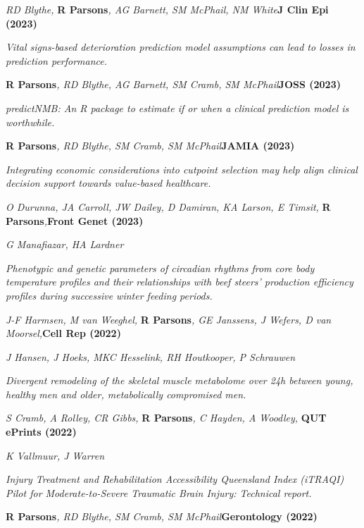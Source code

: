 \item
    \textit{RD Blythe, }\textbf{R Parsons}\textit{, AG Barnett, SM McPhail, NM White}\textbf{\hfill{J Clin Epi (2023)}}\par
    \textit{Vital signs-based deterioration prediction model assumptions can lead to losses in prediction performance.}
\item
    \textbf{R Parsons}\textit{, RD Blythe, AG Barnett, SM Cramb, SM McPhail}\textbf{\hfill{JOSS (2023)}}\par
    \textit{predictNMB: An R package to estimate if or when a clinical prediction model is worthwhile.}
\item
    \textbf{R Parsons}\textit{, RD Blythe, SM Cramb, SM McPhail}\textbf{\hfill{JAMIA (2023)}}\par
    \textit{Integrating economic considerations into cutpoint selection may help align clinical decision support towards value-based healthcare.}
\item
    \textit{O Durunna, JA Carroll, JW Dailey, D Damiran, KA Larson, E Timsit, }\textbf{R Parsons}\textit{,}\textbf{\hfill{Front Genet (2023)}}\par
	\textit{G Manafiazar, HA Lardner}\par
    \textit{Phenotypic and genetic parameters of circadian rhythms from core body temperature profiles and their relationships with beef steers’ production efficiency profiles during successive winter feeding periods.}
\item
    \textit{J-F Harmsen, M van Weeghel, }\textbf{R Parsons}\textit{, GE Janssens, J Wefers, D van Moorsel,}\textbf{\hfill{Cell Rep (2022)}}\par
	\textit{J Hansen, J Hoeks, MKC Hesselink, RH Houtkooper, P Schrauwen}\par
    \textit{Divergent remodeling of the skeletal muscle metabolome over 24h between young, healthy men and older, metabolically compromised men.}
\item
    \textit{S Cramb, A Rolley, CR Gibbs, }\textbf{R Parsons}\textit{, C Hayden, A Woodley, }\textbf{\hfill{QUT ePrints (2022)}}\par
	\textit{K Vallmuur, J Warren}\par
	\textit{Injury Treatment and Rehabilitation Accessibility Queensland Index (iTRAQI) Pilot for Moderate-to-Severe Traumatic Brain Injury: Technical report.}
\item
    \textbf{R Parsons}\textit{, RD Blythe, SM Cramb, SM McPhail}\textbf{\hfill Gerontology (2022)}\par
